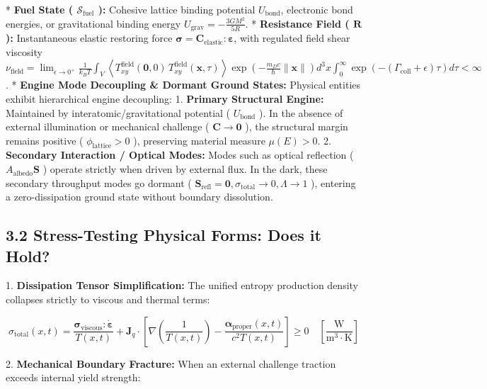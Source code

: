 \documentclass[11pt,a4paper]{article}
\theoremstyle{definition}\newtheorem{definition}{Definition}
\theoremstyle{remark}\newtheorem{remark}{Remark}
\begin{document}
* \textbf{Fuel State ( $\mathcal{S}_{\text{fuel}}$ ):} Cohesive lattice binding potential $U_{\text{bond}}$, electronic bond energies, or gravitational binding energy $U_{\text{grav}} = -\frac{3 G M^2}{5 R}$.
* \textbf{Resistance Field ( $\mathbf{R}$ ):} Instantaneous elastic restoring force $\boldsymbol{\sigma} = \mathbf{C}_{\text{elastic}} : \boldsymbol{\varepsilon}$, with regulated field shear viscosity $\nu_{\text{field}} = \lim_{\epsilon \to 0^+} \frac{1}{k_B T} \int_V \left\langle T_{xy}^{\text{field}}(\mathbf{0}, 0) \, T_{xy}^{\text{field}}(\mathbf{x}, \tau) \right\rangle \exp\left( -\frac{m_D c}{\hbar}\|\mathbf{x}\| \right) d^3x \int_0^\infty \exp\left( -\left(\Gamma_{\text{coll}} + \epsilon\right)\tau \right) d\tau < \infty$.
* \textbf{Engine Mode Decoupling \& Dormant Ground States:}
Physical entities exhibit hierarchical engine decoupling:
1. \textbf{Primary Structural Engine:} Maintained by interatomic/gravitational potential ( $U_{\text{bond}}$ ). In the absence of external illumination or mechanical challenge ( $\mathbf{C} \to \mathbf{0}$ ), the structural margin remains positive ( $\phi_{\text{lattice}} > 0$ ), preserving material measure $\mu(E) > 0$.
2. \textbf{Secondary Interaction / Optical Modes:} Modes such as optical reflection ( $A_{\text{albedo}} \mathbf{S}$ ) operate strictly when driven by external flux. In the dark, these secondary throughput modes go dormant ( $\mathbf{S}_{\text{refl}} = \mathbf{0}, \sigma_{\text{total}} \to 0, \Lambda \to 1$ ), entering a zero-dissipation ground state without boundary dissolution.
\subsection{3.2 Stress-Testing Physical Forms: Does it Hold?}

1. \textbf{Dissipation Tensor Simplification:}
The unified entropy production density collapses strictly to viscous and thermal terms:


\begin{equation}
\sigma_{\text{total}}(x, t) = \frac{\boldsymbol{\sigma}_{\text{viscous}} : \dot{\boldsymbol{\varepsilon}}}{T(x, t)} + \mathbf{J}_q \cdot [ \nabla\left(\frac{1}{T(x, t)}\right) - \frac{\boldsymbol{\alpha}_{\text{proper}}(x, t)}{c^2 T(x, t)} ] \ge 0 \quad [\frac{\mathrm{W}}{\mathrm{m^3 \cdot K}}]
\end{equation}


2. \textbf{Mechanical Boundary Fracture:}
When an external challenge traction exceeds internal yield strength:
\end{document}
